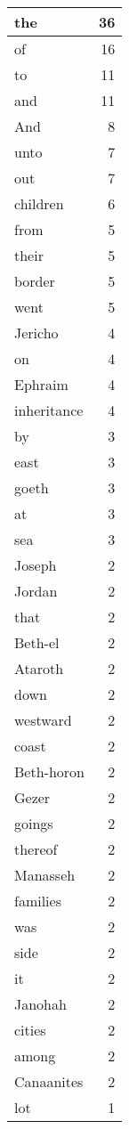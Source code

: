 \begin{center}
\begin{longtable}{l|r}
\hline \hline
\endlastfoot
the & 36 \\ \hline
of & 16 \\ \hline
to & 11 \\ \hline
and & 11 \\ \hline
And & 8 \\ \hline
unto & 7 \\ \hline
out & 7 \\ \hline
children & 6 \\ \hline
from & 5 \\ \hline
their & 5 \\ \hline
border & 5 \\ \hline
went & 5 \\ \hline
Jericho & 4 \\ \hline
on & 4 \\ \hline
Ephraim & 4 \\ \hline
inheritance & 4 \\ \hline
by & 3 \\ \hline
east & 3 \\ \hline
goeth & 3 \\ \hline
at & 3 \\ \hline
sea & 3 \\ \hline
Joseph & 2 \\ \hline
Jordan & 2 \\ \hline
that & 2 \\ \hline
Beth-el & 2 \\ \hline
Ataroth & 2 \\ \hline
down & 2 \\ \hline
westward & 2 \\ \hline
coast & 2 \\ \hline
Beth-horon & 2 \\ \hline
Gezer & 2 \\ \hline
goings & 2 \\ \hline
thereof & 2 \\ \hline
Manasseh & 2 \\ \hline
families & 2 \\ \hline
was & 2 \\ \hline
side & 2 \\ \hline
it & 2 \\ \hline
Janohah & 2 \\ \hline
cities & 2 \\ \hline
among & 2 \\ \hline
Canaanites & 2 \\ \hline
lot & 1 \\ \hline

\end{longtable}
\end{center}
